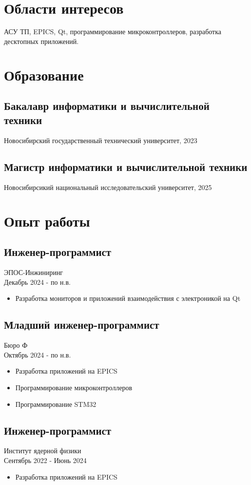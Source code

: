 \documentclass[12pt,a4paper]{article}
\begin{document}
\setlength{\columnsep}{1 cm}
\begin{multicols}{2}[\vskip 1cm]
\section*{Области интересов} 
АСУ ТП, EPICS, Qt, программирование микроконтроллеров, разработка десктопных приложений.
\section*{Образование} \subsection*{Бакалавр информатики и вычислительной техники} Новосибирский государственный технический университет, 2023\\
\subsection*{Магистр информатики и вычислительной техники} 
Новосибирсикий национальный исследовательский университет, 2025\\
\section*{Опыт работы} 
\subsection*{Инженер-программист} ЭПОС-Инжиниринг\\Декабрь 2024 - по н.в.\ 
\begin{itemize} 
\item Разработка мониторов и приложений взаимодействия с электроникой на Qt
\end{itemize}
\subsection*{Младший инженер-программист} Бюро Ф\\Октябрь 2024 - по н.в.\ 
\begin{itemize} 
\item Разработка приложений на EPICS
\item Программирование микроконтроллеров
\item Программирование STM32
\end{itemize}
\subsection*{Инженер-программист} Институт ядерной физики\\Сентябрь 2022 - Июнь 2024\ 
\begin{itemize} 
\item Разработка приложений на EPICS
\end{itemize}


\end{multicols}
\end{document}
